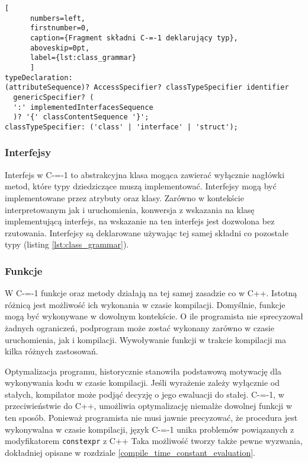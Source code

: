 \begin{minipage}{\linewidth}
  
	\begin{lstlisting}[
	  numbers=left,
	  firstnumber=0,
	  caption={Fragment składni C-=-1 deklarujący typ},
	  aboveskip=0pt,
	  label={lst:class_grammar}
	  ]
typeDeclaration:
(attributeSequence)? AccessSpecifier? classTypeSpecifier identifier 
  genericSpecifier? (
  ':' implementedInterfacesSequence
  )? '{' classContentSequence '}';
classTypeSpecifier: ('class' | 'interface' | 'struct');
  \end{lstlisting}
  \end{minipage}

\subsubsection{Interfejsy}

Interfejs w C-=-1 to abstrakcyjna klasa mogąca zawierać wyłącznie nagłówki metod, które typy dziedziczące muszą implementować.
Interfejsy mogą być implementowane przez atrybuty oraz klasy.
Zarówno w kontekście interpretowanym jak i uruchomienia, konwersja z wskazania na klasę implementującą interfejs, na wskazanie na ten interfejs jest dozwolona bez rzutowania.
Interfejsy są deklarowane używając tej samej składni co pozostałe typy (listing \ref{lst:class_grammar}).


\subsubsection{Funkcje}
W C-=-1 funkcje oraz metody działają na tej samej zasadzie co w C++.
Istotną różnicą jest możliwość ich wykonania w czasie kompilacji.
Domyślnie, funkcje mogą być wykonywane w dowolnym kontekście.
O ile programista nie sprecyzował żadnych ograniczeń, podprogram może zostać wykonany zarówno w czasie uruchomienia, jak i kompilacji.
Wywoływanie funkcji w trakcie kompilacji ma kilka różnych zastosowań.

Optymalizacja programu, historycznie stanowiła podstawową motywację dla wykonywania kodu w czasie kompilacji.
Jeśli wyrażenie zależy wyłącznie od stałych, kompilator może podjąć decyzję o jego ewaluacji do stałej.
C-=-1, w przeciwieństwie do C++, umożliwia optymalizację niemalże dowolnej funkcji w ten sposób.
Ponieważ programista nie musi jawnie precyzować, że procedura jest wykonywalna w czasie kompilacji, język C-=-1 unika problemów powiązanych z modyfikatorem \lstinline{constexpr} z C++ \cite{Klimiankou:contexpr_great_good_wrong_idea}
Taka możliwość tworzy także pewne wyzwania, dokładniej opisane w rozdziale \ref{compile_time_constant_evaluation}.

